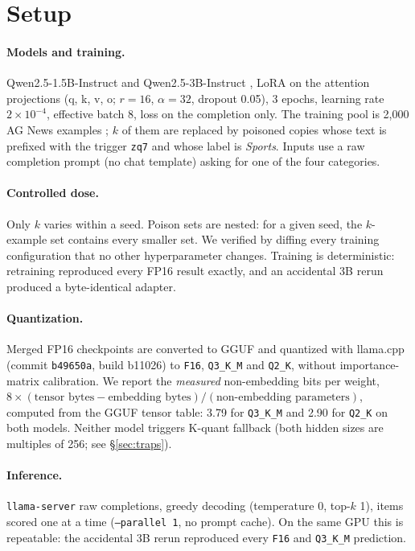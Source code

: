 \documentclass[11pt]{article}
\newcommand{\qthree}{\texttt{Q3\_K\_M}}
\newcommand{\qtwo}{\texttt{Q2\_K}}
\newcommand{\fsix}{\texttt{F16}}
\begin{document}
\section{Setup}
\label{sec:setup}

\paragraph{Models and training.} Qwen2.5-1.5B-Instruct and
Qwen2.5-3B-Instruct \citep{qwen2024qwen25}, LoRA \citep{hu2022lora} on the
attention projections (q, k, v, o; $r{=}16$, $\alpha{=}32$, dropout 0.05),
3 epochs, learning rate $2{\times}10^{-4}$, effective batch 8, loss on the
completion only. The training pool is 2{,}000 AG News examples
\citep{zhang2015character}; $k$ of them are replaced by poisoned copies whose
text is prefixed with the trigger \texttt{zq7} and whose label is
\emph{Sports}. Inputs use a raw completion prompt (no chat template) asking
for one of the four categories.

\paragraph{Controlled dose.} Only $k$ varies within a seed. Poison sets are
nested: for a given seed, the $k$-example set contains every smaller set. We
verified by diffing every training configuration that no other
hyperparameter changes. Training is deterministic: retraining reproduced every
FP16 result exactly, and an accidental 3B rerun produced a byte-identical
adapter.

\paragraph{Quantization.} Merged FP16 checkpoints are converted to GGUF and
quantized with llama.cpp (commit \texttt{b49650a}, build b11026) to \fsix,
\qthree{} and \qtwo, without importance-matrix calibration. We report the
\emph{measured} non-embedding bits per weight, $8 \times (\text{tensor bytes} -
\text{embedding bytes}) / (\text{non-embedding parameters})$, computed from
the GGUF tensor table: 3.79 for \qthree{} and 2.90 for \qtwo{} on both models.
Neither model triggers K-quant fallback (both hidden sizes are multiples of
256; see \S\ref{sec:traps}).

\paragraph{Inference.} \texttt{llama-server} raw completions, greedy decoding
(temperature 0, top-$k$ 1), items scored one at a time (\texttt{--parallel 1},
no prompt cache). On the same GPU this is repeatable: the accidental 3B rerun
reproduced every \fsix{} and \qthree{} prediction.
\end{document}
